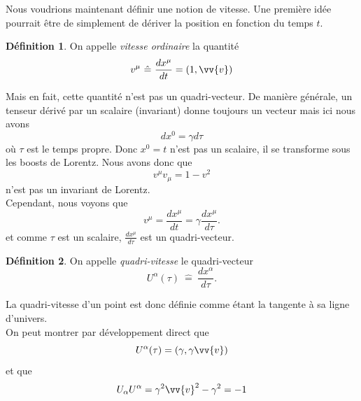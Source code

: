 \documentclass[a4paper,11pt]{report}
\theoremstyle{definition}
\theoremstyle{plain}
\theoremstyle{definition}
\newtheorem{defn}{Définition}[chapter]
\theoremstyle{remark}
\begin{document}
            Nous voudrions maintenant définir une notion de vitesse. Une première idée pourrait être de simplement de dériver la position en fonction du temps $t$.
            \begin{defn}
                On appelle \textit{vitesse ordinaire} la quantité
                \begin{equation}
                v^\mu ~\hat{=}~ \frac{dx^\mu}{dt} = (1,\vv{v})
                \end{equation}
            \end{defn}
            Mais en fait, cette quantité n'est pas un quadri-vecteur. De manière générale, un tenseur dérivé par un scalaire (invariant) donne toujours un vecteur mais ici nous avons
            \begin{equation}
                dx^0 = \gamma d\tau
            \end{equation}
            où $\tau$ est le temps propre. Donc $x^0 = t$ n'est pas un scalaire, il se transforme sous les boosts de Lorentz. Nous avons donc que 
            \begin{equation}
                v^\mu v_\mu = 1-v^2 
            \end{equation}
            n'est pas un invariant de Lorentz.\\
            Cependant, nous voyons que
            \begin{equation}
                v^\mu = \frac{dx^\mu}{dt} = \gamma \frac{dx^\mu}{d\tau}.
            \end{equation}
            et comme $\tau$ est un scalaire, $\frac{dx^\mu}{d\tau}$ est un quadri-vecteur.
            \begin{defn}
                On appelle \textit{quadri-vitesse} le quadri-vecteur
                \begin{equation}
                    U^\alpha(\tau) ~\hat{=}~ \frac{dx^\alpha}{d\tau}.
                \end{equation}
            \end{defn}
            La quadri-vitesse d'un point est donc définie comme étant la tangente à sa ligne d'univers.\\
            On peut montrer par développement direct que 
            \begin{equation}
                U^\alpha(\tau) = (\gamma,\gamma\vv{v})
            \end{equation}
            et que 
            \begin{equation}
                U_\alpha U^\alpha = \gamma^2\vv{v}^2-\gamma^2 = -1
            \end{equation}
        
\end{document}
